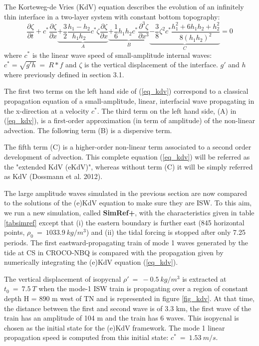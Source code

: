 \documentclass[a4paper,12pt]{article}
\begin{document}
The Korteweg-de Vries (KdV) equation describes the evolution of an infinitely thin interface in a two-layer system with constant bottom topography:
\begin{equation}
\frac{\partial \zeta}{\partial t} 
+c^* \frac{\partial \zeta}{\partial x}
\underbrace{+ \frac{3}{2} \frac{h_1-h_2}{h_1h_2} c^* \zeta \frac{\partial \zeta}{\partial x} }_{A}
\underbrace{+ \frac{1}{6} h_1h_2c^* \frac{\partial ^3 \zeta}{\partial x^3} }_{B}
\underbrace{ - \frac{3}{8}\zeta^2c^*\frac{h_1^2+6h_1h_2+h_2^2}{8(h_1h_2)^2} }_{C}
=0
\label{eq_kdv}
\end{equation}
where $c^*$ is the linear wave speed of small-amplitude internal waves: $c^*=\sqrt{g' h}\ = \ R*f$ and $\zeta$ is the vertical displacement of the interface. $g'$ and $h$ where previously defined in section 3.1.

The first two terms on the left hand side of (\ref{eq_kdv}) correspond to a classical propagation equation of a small-amplitude, linear, interfacial wave propagating in the x-direction at a velocity $c^*$. The third term on the left hand side, (A) in (\ref{eq_kdv}), is a first-order approximation (in term of amplitude) of the non-linear advection. The following term (B) is a dispersive term.

The fifth term (C) is a higher-order non-linear term associated to a second order development of advection. This complete equation (\ref{eq_kdv}) will be referred as the "extended KdV (eKdV)", whereas without term (C) it will be simply referred as KdV (Dossmann et al. 2012). 

The large amplitude waves simulated in the previous section are now compared to the solutions of the (e)KdV equation to make sure they are ISW. To this aim, we run a new simulation, called \textbf{SimRef+}, with the characteristics given in table \ref{tabsimref} except that (i) the eastern boundary is further east (845 horizontal points, $\rho_0\ =\ 1033.9 \ kg/m^3$) and (ii) the tidal forcing is stopped after only 7.25 periods. The first eastward-propagating train of mode 1 waves generated by the tide at CS in CROCO-NBQ is compared with the propagation given by numerically integrating the (e)KdV equation (\ref{eq_kdv}).

The vertical displacement of isopycnal $\rho'\ =\ -0.5\ kg/m^3$ is extracted at $t_0\ =\ 7.5\ T$ when the mode-1 ISW train is propagating over a region of constant depth H = 890 m west of TN and is represented in figure \ref{fig_kdv}. At that time, the distance between the first and second wave is of 3.3 km, the first wave of the train has an amplitude of 104 m and the train has 6 waves. This isopycnal is chosen as the initial state for the (e)KdV framework. The mode 1 linear propagation speed is computed from this initial state: $c^*\ =\ 1.53\ m/s$.
\end{document}
